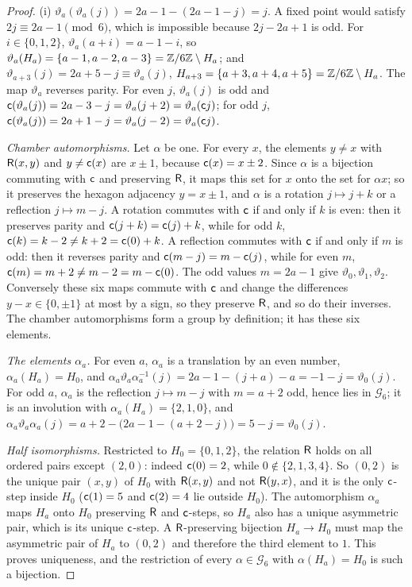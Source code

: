 \begin{proof}
(i) $\vartheta_a(\vartheta_a(j))=2a-1-(2a-1-j)=j$. A fixed point would satisfy
$2j\equiv2a-1\pmod6$, which is impossible because $2j-2a+1$ is odd. For
$i\in\{0,1,2\}$, $\vartheta_a(a+i)=a-1-i$, so
$\vartheta_a(H_a)=\{a-1,a-2,a-3\}=\mathbb Z/6\mathbb Z\setminus H_a$; and
$\vartheta_{a+3}(j)=2a+5-j\equiv\vartheta_a(j)$,
$H_{a+3}=\{a+3,a+4,a+5\}=\mathbb Z/6\mathbb Z\setminus H_a$. The map $\vartheta_a$ reverses
parity. For even $j$, $\vartheta_a(j)$ is odd and
$\mathsf c(\vartheta_a(j))=2a-3-j=\vartheta_a(j+2)=\vartheta_a(\mathsf c j)$; for odd $j$,
$\mathsf c(\vartheta_a(j))=2a+1-j=\vartheta_a(j-2)=\vartheta_a(\mathsf c j)$.

\emph{Chamber automorphisms.} Let $\alpha$ be one. For every $x$, the elements
$y\ne x$ with $\mathsf R(x,y)$ and $y\ne\mathsf c(x)$ are $x\pm1$, because
$\mathsf c(x)=x\pm2$. Since $\alpha$ is a bijection commuting with $\mathsf c$ and
preserving $\mathsf R$, it maps this set for $x$ onto the set for $\alpha x$; so it
preserves the hexagon adjacency $y=x\pm1$, and $\alpha$ is a rotation
$j\mapsto j+k$ or a reflection $j\mapsto m-j$. A rotation commutes with $\mathsf c$
if and only if $k$ is even: then it preserves parity and
$\mathsf c(j+k)=\mathsf c(j)+k$, while for odd $k$, $\mathsf c(k)=k-2\ne k+2=\mathsf c(0)+k$. A
reflection commutes with $\mathsf c$ if and only if $m$ is odd: then it reverses
parity and $\mathsf c(m-j)=m-\mathsf c(j)$, while for even $m$,
$\mathsf c(m)=m+2\ne m-2=m-\mathsf c(0)$. The odd values $m=2a-1$ give
$\vartheta_0,\vartheta_1,\vartheta_2$. Conversely these six maps commute with
$\mathsf c$ and change the differences $y-x\in\{0,\pm1\}$ at most by a sign, so
they preserve $\mathsf R$, and so do their inverses. The chamber automorphisms form
a group by definition; it has these six elements.

\emph{The elements $\alpha_a$.} For even $a$, $\alpha_a$ is a translation by an
even number, $\alpha_a(H_a)=H_0$, and
$\alpha_a\vartheta_a\alpha_a^{-1}(j)=2a-1-(j+a)-a=-1-j=\vartheta_0(j)$. For odd
$a$, $\alpha_a$ is the reflection $j\mapsto m-j$ with $m=a+2$ odd, hence lies
in $\mathcal G_6$; it is an involution with $\alpha_a(H_a)=\{2,1,0\}$, and
$\alpha_a\vartheta_a\alpha_a(j)=a+2-\big(2a-1-(a+2-j)\big)=5-j=\vartheta_0(j)$.

\emph{Half isomorphisms.} Restricted to $H_0=\{0,1,2\}$, the relation $\mathsf R$
holds on all ordered pairs except $(2,0)$: indeed $\mathsf c(0)=2$, while
$0\notin\{2,1,3,4\}$. So $(0,2)$ is the unique pair $(x,y)$ of $H_0$ with
$\mathsf R(x,y)$ and not $\mathsf R(y,x)$, and it is the only $\mathsf c$-step inside $H_0$
($\mathsf c(1)=5$ and $\mathsf c(2)=4$ lie outside $H_0$). The automorphism $\alpha_a$
maps $H_a$ onto $H_0$ preserving $\mathsf R$ and $\mathsf c$-steps, so $H_a$ also has a
unique asymmetric pair, which is its unique $\mathsf c$-step. A $\mathsf R$-preserving
bijection $H_a\to H_0$ must map the asymmetric pair of $H_a$ to $(0,2)$ and
therefore the third element to $1$. This proves uniqueness, and the restriction
of every $\alpha\in\mathcal G_6$ with $\alpha(H_a)=H_0$ is such a bijection.


\end{proof}
